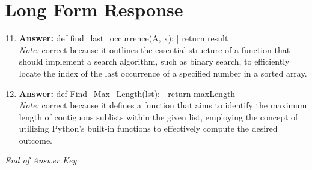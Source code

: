 \documentclass[12pt]{article}
\begin{document}
\section*{Long Form Response}
\begin{enumerate}[label=\arabic*.]
\setcounter{enumi}{10}
\item \textbf{Answer:} def find\_last\_occurrence(A, x): | return result
\\ \textit{Note:} correct because it outlines the essential structure of a function that should implement a search algorithm, such as binary search, to efficiently locate the index of the last occurrence of a specified number in a sorted array.
\item \textbf{Answer:} def Find\_Max\_Length(lst): | return maxLength
\\ \textit{Note:} correct because it defines a function that aims to identify the maximum length of contiguous sublists within the given list, employing the concept of utilizing Python's built-in functions to effectively compute the desired outcome.
\end{enumerate}

\vfill
\noindent\textit{End of Answer Key}
\end{document}
